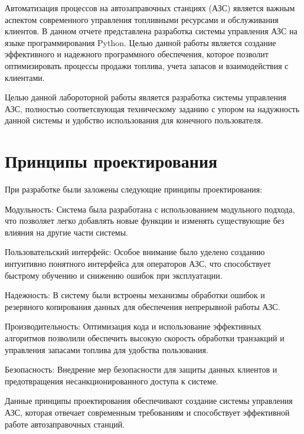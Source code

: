 \documentclass{vvsu}
\begin{document}
\toc


\begin{introduction}
Автоматизация процессов на автозаправочных станциях (АЗС) является важным аспектом современного управления топливными ресурсами и обслуживания клиентов. В данном отчете представлена разработка системы управления АЗС на языке программирования Python. Целью данной работы является создание эффективного и надежного программного обеспечения, которое позволит оптимизировать процессы продажи топлива, учета запасов и взаимодействия с клиентами.
  
Целью данной лабороторной работы является разработка системы управления АЗС, полностью соответсвующая техническому заданию с упором на надужность данной системы и удобство использования для конечного пользователя.

\end{introduction}


\section{Принципы проектирования}
  При разработке были заложены следующие принципы проектирования:
\begin{vvsu_itemize}
    \item Модульность: Система была разработана с использованием модульного подхода, что позволяет легко добавлять новые функции и изменять существующие без влияния на другие части системы.
    \item Пользовательский интерфейс: Особое внимание было уделено созданию интуитивно понятного интерфейса для операторов АЗС, что способствует быстрому обучению и снижению ошибок при эксплуатации.
    \item Надежность: В систему были встроены механизмы обработки ошибок и резервного копирования данных для обеспечения непрерывной работы АЗС.
    \item Производительность: Оптимизация кода и использование эффективных алгоритмов позволили обеспечить высокую скорость обработки транзакций и управления запасами топлива для удобства пользования.
    \item Безопасность: Внедрение мер безопасности для защиты данных клиентов и предотвращения несанкционированного доступа к системе.
\end{vvsu_itemize}
  Данные принципы проектирования обеспечивают создание системы управления АЗС, которая отвечает современным требованиям и способствует эффективной работе автозаправочных станций.
\end{document}
